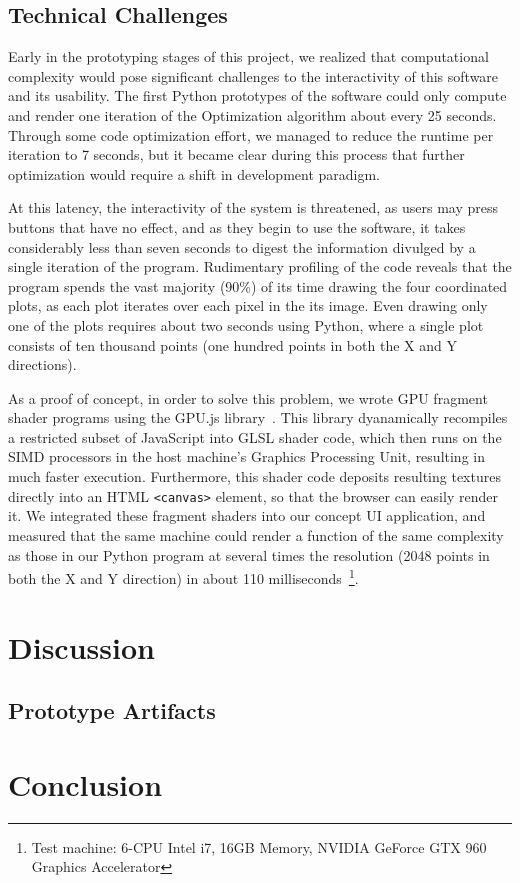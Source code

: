 \documentclass{vgtc}                          %
\begin{document}
\subsection{Technical Challenges}

Early in the prototyping stages of this project, we realized that computational
complexity would pose significant challenges to the interactivity of this
software and its usability. The first Python prototypes of the software could
only compute and render one iteration of the Optimization algorithm about every
25 seconds. Through some code optimization effort, we managed to reduce the
runtime per iteration to 7 seconds, but it became clear during this process
that further optimization would require a shift in development paradigm.

At this latency, the interactivity of the system is threatened, as users may
press buttons that have no effect, and as they begin to use the software, it
takes considerably less than seven seconds to digest the information divulged
by a single iteration of the program. Rudimentary profiling of the code reveals
that the program spends the vast majority (90\%) of its time drawing the four
coordinated plots, as each plot iterates over each pixel in the its image. Even
drawing only one of the plots requires about two seconds using Python, where a
single plot consists of ten thousand points (one hundred points in both the X
and Y directions).

As a proof of concept, in order to solve this problem, we wrote GPU fragment
shader programs using the GPU.js library~\cite{GPUjs}. This library
dyanamically recompiles a restricted subset of JavaScript into GLSL shader
code, which then runs on the SIMD processors in the host machine's Graphics
Processing Unit, resulting in much faster execution. Furthermore, this shader
code deposits resulting textures directly into an HTML \texttt{<canvas>}
element, so that the browser can easily render it. We integrated these fragment
shaders into our concept UI application, and measured that the same machine
could render a function of the same complexity as those in our Python program at
several times the resolution (2048 points in both the X and Y direction) in
about 110 milliseconds~\footnote{Test machine: 6-CPU Intel i7, 16GB Memory,
NVIDIA GeForce GTX 960 Graphics Accelerator}.

\section{Discussion}

\subsection{Prototype Artifacts}

\section{Conclusion}

%

%
%
%


\end{document}
